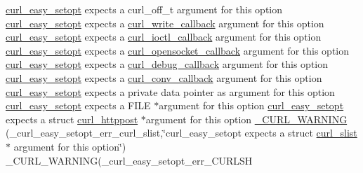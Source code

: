 \begin{DoxyCompactItemize}
\hyperlink{easy_8h_a7b171739b7bb728b3b58b2e6ec454aa0}{curl\+\_\+easy\+\_\+setopt} expects a curl\+\_\+off\+\_\+t argument for this option \hyperlink{easy_8h_a7b171739b7bb728b3b58b2e6ec454aa0}{curl\+\_\+easy\+\_\+setopt} expects a \hyperlink{curl_8h_ad65e62dcde45b356254b0f25f38dd802}{curl\+\_\+write\+\_\+callback} argument for this option \hyperlink{easy_8h_a7b171739b7bb728b3b58b2e6ec454aa0}{curl\+\_\+easy\+\_\+setopt} expects a \hyperlink{curl_8h_ae0524f6ec082005e39eb275c71c59a3b}{curl\+\_\+ioctl\+\_\+callback} argument for this option \hyperlink{easy_8h_a7b171739b7bb728b3b58b2e6ec454aa0}{curl\+\_\+easy\+\_\+setopt} expects a \hyperlink{curl_8h_a1b8b8f3e1a4e538a6bb1dd83a3388547}{curl\+\_\+opensocket\+\_\+callback} argument for this option \hyperlink{easy_8h_a7b171739b7bb728b3b58b2e6ec454aa0}{curl\+\_\+easy\+\_\+setopt} expects a \hyperlink{curl_8h_a50147c55283ee1fa3322b0d5aff2326c}{curl\+\_\+debug\+\_\+callback} argument for this option \hyperlink{easy_8h_a7b171739b7bb728b3b58b2e6ec454aa0}{curl\+\_\+easy\+\_\+setopt} expects a \hyperlink{curl_8h_acb230bf6dbf7bcb6e4e8740ea42ca3b3}{curl\+\_\+conv\+\_\+callback} argument for this option \hyperlink{easy_8h_a7b171739b7bb728b3b58b2e6ec454aa0}{curl\+\_\+easy\+\_\+setopt} expects a private data pointer as argument for this option \hyperlink{easy_8h_a7b171739b7bb728b3b58b2e6ec454aa0}{curl\+\_\+easy\+\_\+setopt} expects a F\+I\+L\+E $\ast$argument for this option \hyperlink{easy_8h_a7b171739b7bb728b3b58b2e6ec454aa0}{curl\+\_\+easy\+\_\+setopt} expects a struct \hyperlink{structcurl__httppost}{curl\+\_\+httppost} $\ast$argument for this option \hyperlink{typecheck-gcc_8h_a41371b428503baed0e38186cb78e4b7a}{\+\_\+\+C\+U\+R\+L\+\_\+\+W\+A\+R\+N\+I\+N\+G} (\+\_\+curl\+\_\+easy\+\_\+setopt\+\_\+err\+\_\+curl\+\_\+slist,\char`\"{}curl\+\_\+easy\+\_\+setopt expects a struct \hyperlink{structcurl__slist}{curl\+\_\+slist}$\ast$ argument for this option\char`\"{}) \+\_\+\+C\+U\+R\+L\+\_\+\+W\+A\+R\+N\+I\+N\+G(\+\_\+curl\+\_\+easy\+\_\+setopt\+\_\+err\+\_\+\+C\+U\+R\+L\+S\+H
\item 

\end{DoxyCompactItemize}
